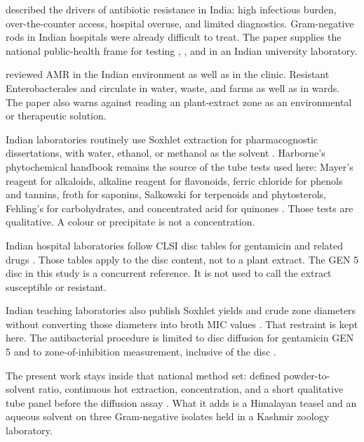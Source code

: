 \citet{laxminarayan2016antibiotic} described the drivers of antibiotic resistance in India: high infectious burden, over-the-counter access, hospital overuse, and limited diagnostics. Gram-negative rods in Indian hospitals were already difficult to treat. The paper supplies the national public-health frame for testing , , and  in an Indian university laboratory.

\citet{taneja2019antimicrobial} reviewed AMR in the Indian environment as well as in the clinic. Resistant Enterobacterales and  circulate in water, waste, and farms as well as in wards. The paper also warns against reading an \invitro{} plant-extract zone as an environmental or therapeutic solution.

Indian laboratories routinely use Soxhlet extraction for pharmacognostic dissertations, with water, ethanol, or methanol as the solvent \citep{azwanida2015review}. Harborne's phytochemical handbook remains the source of the tube tests used here: Mayer's reagent for alkaloids, alkaline reagent for flavonoids, ferric chloride for phenols and tannins, froth for saponins, Salkowski for terpenoids and phytosterols, Fehling's for carbohydrates, and concentrated acid for quinones \citep{harbone1998phytochemical}. Those tests are qualitative. A colour or precipitate is not a concentration.

Indian hospital laboratories follow CLSI disc tables for gentamicin and related drugs \citep{clsi2024m100}. Those tables apply to the disc content, not to a plant extract. The GEN 5 disc in this study is a concurrent reference. It is not used to call the extract susceptible or resistant.

Indian teaching laboratories also publish Soxhlet yields and crude zone diameters without converting those diameters into broth MIC values \citep{azwanida2015review,balouiri2016methods}. That restraint is kept here. The antibacterial procedure is limited to disc diffusion for gentamicin GEN 5 and to zone-of-inhibition measurement, inclusive of the disc \citep{bauer1966antibiotic,balouiri2016methods}.

The present work stays inside that national method set: defined powder-to-solvent ratio, continuous hot extraction, concentration, and a short qualitative tube panel before the diffusion assay \citep{harbone1998phytochemical,ahmad2001antimicrobial}. What it adds is a Himalayan teasel and an aqueous solvent on three Gram-negative isolates held in a Kashmir zoology laboratory.

